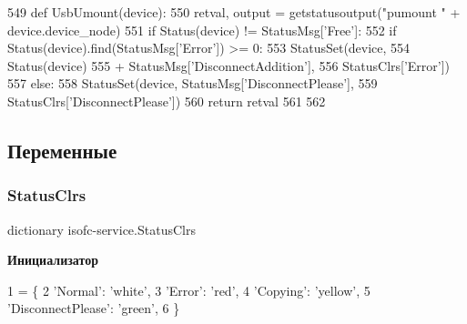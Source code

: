 \begin{DoxyCode}
549 \textcolor{keyword}{def }UsbUmount(device):
550     retval, output = getstatusoutput(\textcolor{stringliteral}{"pumount "} + device.device\_node)
551     \textcolor{keywordflow}{if} Status(device) != StatusMsg[\textcolor{stringliteral}{'Free'}]:
552         \textcolor{keywordflow}{if} Status(device).find(StatusMsg[\textcolor{stringliteral}{'Error'}]) >= 0:
553             StatusSet(device,
554                       Status(device)
555                       + StatusMsg[\textcolor{stringliteral}{'DisconnectAddition'}],
556                       StatusClrs[\textcolor{stringliteral}{'Error'}])
557         \textcolor{keywordflow}{else}:
558             StatusSet(device, StatusMsg[\textcolor{stringliteral}{'DisconnectPlease'}],
559                       StatusClrs[\textcolor{stringliteral}{'DisconnectPlease'}])
560     \textcolor{keywordflow}{return} retval
561 
562 
\end{DoxyCode}


\subsection{Переменные}
\mbox{\label{isofc-service_8py_file_a32430ce5e336e5cb8ec2df27f66b86dd}} 
\subsubsection{\texorpdfstring{Status\+Clrs}{StatusClrs}}
{\footnotesize\ttfamily dictionary isofc-\/service.\+Status\+Clrs}

{\bfseries Инициализатор}
\begin{DoxyCode}
1 =  \{
2     \textcolor{stringliteral}{'Normal'}: \textcolor{stringliteral}{'white'},
3     \textcolor{stringliteral}{'Error'}: \textcolor{stringliteral}{'red'},
4     \textcolor{stringliteral}{'Copying'}: \textcolor{stringliteral}{'yellow'},
5     \textcolor{stringliteral}{'DisconnectPlease'}: \textcolor{stringliteral}{'green'},
6 \}
\end{DoxyCode}
\mbox{\label{isofc-service_8py_file_a86c2854b086f3034ce6820a9db41f34b}} 
